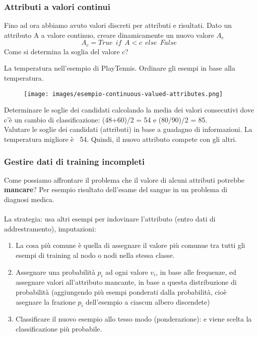 \subsubsection{Attributi a valori continui}
Fino ad ora abbiamo avuto valori discreti per attributi e risultati. Dato un attributo A a valore continuo, creare dinamicamente un nuovo valore $A_c$ 
$$A_c = True \:\: if \:\: A < c \:\: else \:\: False$$
\newpage
\hspace{-15pt}Come si determina la soglia del valore $c$?
\begin{example}
    La temperatura nell'esempio di PlayTennis. Ordinare gli esempi in base alla temperatura.
    \begin{figure}[h!]
        \centering
        \texttt{[image: images/esempio-continuous-valued-attributes.png]}
    \end{figure}

    \hspace{-15pt}Determinare le soglie dei candidati calcolando la media dei valori consecutivi dove c'è un cambio di classificazione: (48+60)/2 = 54 e (80/90)/2 = 85.\\
    Valutare le soglie dei candidati (attributi) in base a guadagno di informazioni. La temperatura migliore è $\>$ 54. Quindi, il nuovo attributo compete con gli altri.
\end{example}

\subsubsection{Gestire dati di training incompleti}
Come possiamo affrontare il problema che il valore di alcuni attributi potrebbe \textbf{mancare}? Per esempio risultato dell'esame del sangue in un problema di 
diagnosi medica.\\\\
La strategia: usa altri esempi per indovinare l'attributo (entro dati di addrestramento), imputazioni:
\begin{enumerate}
    \item La cosa più comune è quella di assegnare il valore più comunue tra tutti gli esempi di training al nodo o nodi nella stessa classe.
    \item Assegnare una probabilità $p_i$ ad ogni valore $v_i$, in base alle frequenze, ed assegnare valori all'attributo mancante, in base a questa distribuzione di probabilità (aggiungendo più esempi ponderati dalla probabilità, cioè asegnare la frazione $p_i$ dell'esempio a ciascun albero discendete)
    \item Classificare il nuovo esempio allo tesso modo (ponderazione): e viene scelta la classificazione più probabile.
\end{enumerate}

